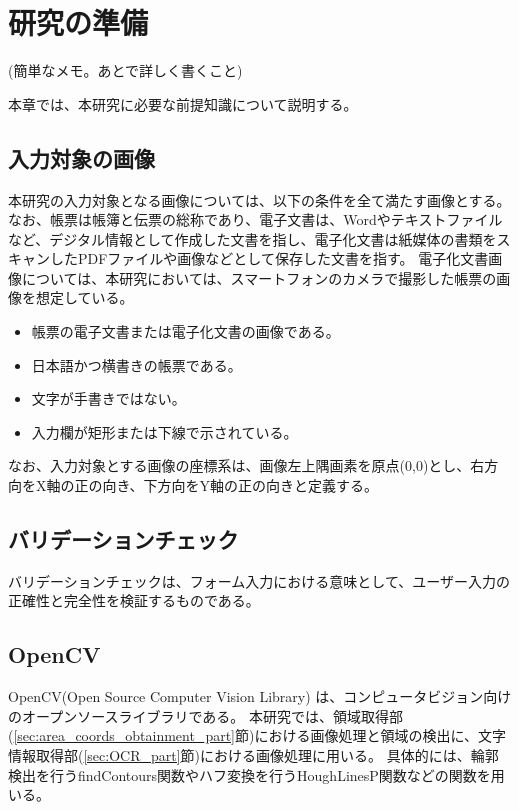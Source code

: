 \chapter{研究の準備}\label{cha:Preparation}
(簡単なメモ。あとで詳しく書くこと)

本章では、本研究に必要な前提知識について説明する。


\section{入力対象の画像}\label{sec:input_images}
本研究の入力対象となる画像については、以下の条件を全て満たす画像とする。
なお、帳票は帳簿と伝票の総称であり\cite{帳票}、電子文書は、Wordやテキストファイルなど、デジタル情報として作成した文書を指し、電子化文書は紙媒体の書類をスキャンしたPDFファイルや画像などとして保存した文書を指す\cite{電子文書と電子化文書}。
電子化文書画像については、本研究においては、スマートフォンのカメラで撮影した帳票の画像を想定している。

\begin{itemize}
  \item 帳票の電子文書または電子化文書の画像である。
  \item 日本語かつ横書きの帳票である。
  \item 文字が手書きではない。
  \item 入力欄が矩形または下線で示されている。
\end{itemize}

なお、入力対象とする画像の座標系は、画像左上隅画素を原点(0,0)とし、右方向をX軸の正の向き、下方向をY軸の正の向きと定義する。

\section{バリデーションチェック}\label{sec:validation_check}
バリデーションチェックは、フォーム入力における意味として、ユーザー入力の正確性と完全性を検証するものである\cite{バリデーションチェック}。


\section{OpenCV}\label{sec:OpenCV}
OpenCV(Open Source Computer Vision Library) は、コンピュータビジョン向けのオープンソースライブラリである\cite{OpenCV}。
本研究では、領域取得部(\ref{sec:area_coords_obtainment_part}節)における画像処理と領域の検出に、文字情報取得部(\ref{sec:OCR_part}節)における画像処理に用いる。
具体的には、輪郭検出を行うfindContours関数やハフ変換を行うHoughLinesP関数などの関数を用いる。


